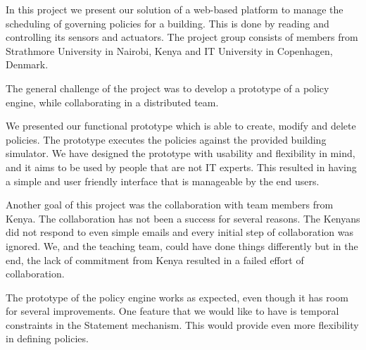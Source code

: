 In this project we present our solution of a web-based platform to manage the scheduling of governing policies for a building. This is done by reading and controlling its sensors and actuators. The project group consists of members from Strathmore University in Nairobi, Kenya and IT University in Copenhagen, Denmark.

The general challenge of the project was to develop a prototype of a policy engine, while collaborating in a distributed team. 

We presented our functional prototype which is able to create, modify and delete policies. The prototype executes the policies against the provided building simulator. We have designed the prototype with usability and flexibility in mind, and it aims to be used by people that are not IT experts. This resulted in having a simple and user friendly interface that is manageable by the end users. 

Another goal of this project was the collaboration with team members from Kenya. The collaboration has not been a success for several reasons. The Kenyans did not respond to even simple emails and every initial step of collaboration was ignored. We, and the teaching team, could have done things differently but in the end, the lack of commitment from Kenya resulted in a failed effort of collaboration.
 
The prototype of the policy engine works as expected, even though it has room for several improvements. One feature that we would like to have is temporal constraints in the Statement mechanism. This would provide even more flexibility in defining policies.


